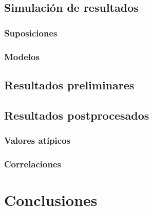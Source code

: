 \documentclass[12pt]{book}
\begin{document}
\section{Simulación de resultados}
\subsection{Suposiciones}
\subsection{Modelos}
\section{Resultados preliminares}
\section{Resultados postprocesados}
\subsection{Valores atípicos}
\subsection{Correlaciones}
\chapter{Conclusiones}
\end{document}
